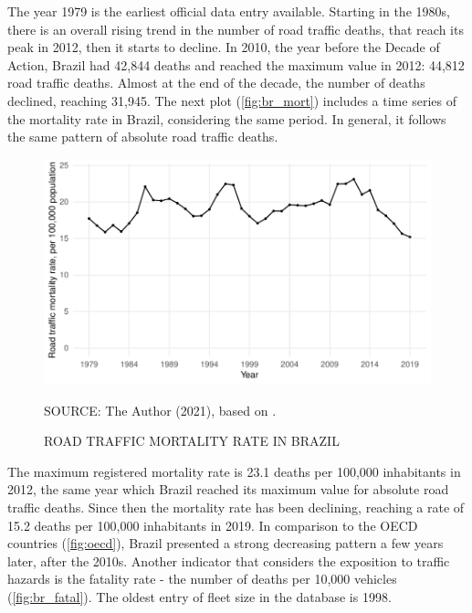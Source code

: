 The year 1979 is the earliest official data entry available. Starting in the 1980s, there is an overall rising trend in the number of road traffic deaths, that reach its peak in 2012, then it starts to decline. In 2010, the year before the Decade of Action, Brazil had 42,844 deaths and reached the maximum value in 2012: 44,812 road traffic deaths. Almost at the end of the decade, the number of deaths declined, reaching 31,945. The next plot (\autoref{fig:br_mort}) includes a time series of the mortality rate in Brazil, considering the same period. In general, it follows the same pattern of absolute road traffic deaths.

\begin{figure}[!htbp]
    \centering\footnotesize
    \captionsetup{font=footnotesize}
    \caption{ROAD TRAFFIC MORTALITY RATE IN BRAZIL}
    \includegraphics{fig/brazil_mort.pdf}
    \label{fig:br_mort}
    \par SOURCE: The Author (2021), based on \textcite{MinistryofHealth2020, MinistryofHealth2021}. 
\end{figure}

The maximum registered mortality rate is 23.1 deaths per 100,000 inhabitants in 2012, the same year which Brazil reached its maximum value for absolute road traffic deaths. Since then the mortality rate has been declining, reaching a rate of 15.2 deaths per 100,000 inhabitants in 2019. In comparison to the OECD countries (\autoref{fig:oecd}), Brazil presented a strong decreasing pattern a few years later, after the 2010s. Another indicator that considers the exposition to traffic hazards is the fatality rate - the number of deaths per 10,000 vehicles (\autoref{fig:br_fatal}). The oldest entry of fleet size in the \textcite{DENATRAN2020} database is 1998.

